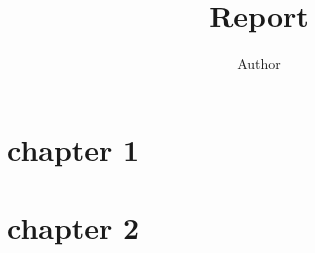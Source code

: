 \documentclass[a4paper, 12pt]{article}
\title{Report}
\author{Author}
\begin{document}
\maketitle
\sloppy
\section{chapter 1}
\cite{example_ref}
\section{chapter 2}
\printbibliography
\end{document}
